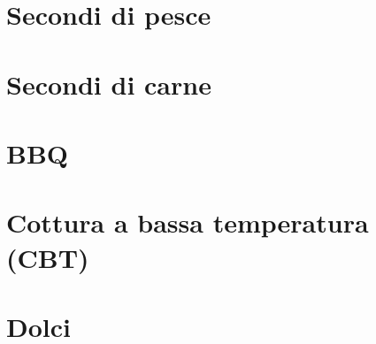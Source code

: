 \documentclass{report}
\begin{document}
\newpage
\chapter{Secondi di pesce}




\newpage
\chapter{Secondi di carne}



\newpage
\chapter{BBQ}






\newpage
\chapter{Cottura a bassa temperatura (CBT)}



%
\newpage
\chapter{Dolci}













\end{document}
